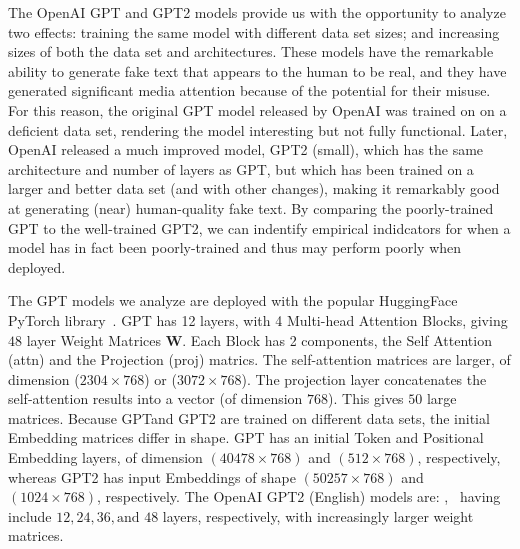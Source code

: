 The OpenAI GPT and GPT2 models provide us with the opportunity to analyze two effects: training the same model with different data set sizes; and increasing sizes of both the data set and architectures.
These models have the remarkable ability to generate fake text that appears to the human to be real, and they have generated significant media attention because of the potential for their misuse.
For this reason, the original GPT model released by OpenAI was trained on on a deficient data set, rendering the model interesting but not fully functional.  
Later, OpenAI released a much improved model, GPT2 (small), which has the same architecture and number of layers as GPT, but which has been trained on a larger and better data set (and with other changes), making it remarkably good at generating (near) human-quality fake text.  
%
By comparing the poorly-trained GPT to the well-trained GPT2, we can indentify empirical indidcators for when a model has in fact been poorly-trained and thus may perform poorly when deployed.

The GPT models we analyze are deployed with the popular HuggingFace PyTorch library~\cite{XXX-XXX}.
GPT has 12 layers, with 4 Multi-head Attention Blocks, giving $48$ layer Weight Matrices $\mathbf{W}$.
Each Block has 2 components, the Self Attention (attn) and the Projection (proj) matrics.  
The self-attention  matrices are larger, of dimension ($2304\times 768$) or ($3072\times 768$).
The projection layer concatenates the self-attention results into a vector (of dimension $768$).
This gives $50$ large matrices.
%
Because GPTand GPT2 are trained on different data sets, the initial Embedding matrices differ in shape.
GPT has an initial Token and Positional Embedding layers, of dimension $(40478\times 768)$ and $(512\times 768)$, respectively, whereas GPT2 has input Embeddings of shape $(50257\times 768)$ and $(1024\times 768)$, respectively. 
%
The OpenAI GPT2 (English) models are: , \
having include $12, 24, 36, \text{and }48$ layers, respectively, with increasingly larger weight matrices.


